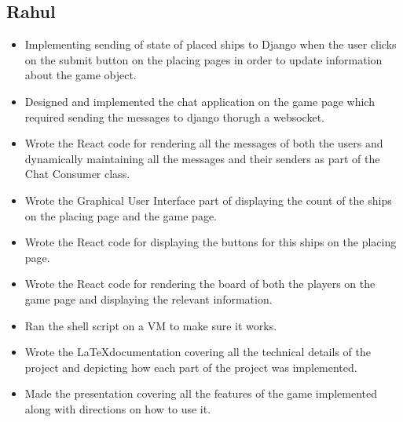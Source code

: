 \documentclass[titlepage]{article}
\begin{document}
\subsection{Rahul}
    \begin{itemize}
        \item Implementing sending of state of placed ships to Django when the user clicks on the submit button on the placing pages in order to update information about the game object.
        \item Designed and implemented the chat application on the game page which required sending the messages to django thorugh a websocket.
        \item Wrote the React code for rendering all the messages of both the users and dynamically maintaining all the messages and their senders as part of the Chat Consumer class.
        \item Wrote the Graphical User Interface part of displaying the count of the ships on the placing page and the game page.
        \item Wrote the React code for displaying the buttons for this ships on the placing page.
        \item Wrote the React code for rendering the board of both the players on the game page and displaying the relevant information.
        \item Ran the shell script on a VM to make sure it works.
        \item Wrote the \LaTeX\space documentation covering all the technical details of the project and depicting how each part of the project was implemented.
        \item Made the presentation covering all the features of the game implemented along with directions on how to use it.
    \end{itemize}
\end{document}
